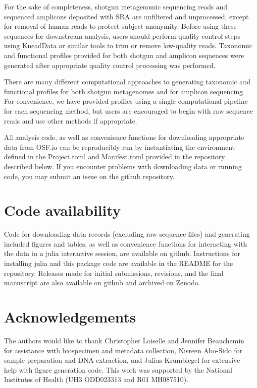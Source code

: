 \documentclass[fleqn,10pt]{wlscirep}
\begin{document}
For the sake of completeness, shotgun metagenomic sequencing reads and sequenced amplicons deposited with SRA
are unfiltered and unprocessed, except for removal of human reads to protect subject anonymity.
Before using these sequences for downstream analysis, users should perform quality control steps
using KneadData or similar tools to trim or remove low-quality reads.
Taxonomic and functional profiles provided for both shotgun and amplicon sequences
were generated after appropriate quality control processing was performed. 

There are many different computational approaches to generating taxonomic and functional profiles
for both shotgun metagenomes and for amplicon sequencing.
For convenience, we have provided profiles using a single computational pipeline for each sequencing method,
but users are encouraged to begin with raw sequence reads and use other methods if appropriate.

All analysis code, as well as convenience functions for downloading appropriate data from OSF.io
can be reproducibly run by instantiating the environment defined in the Project.toml and Manifest.toml
provided in the repository described below.
If you encounter problems with downloading data or running code, you may submit an issue on the github repository.

\section*{Code availability}

Code for downloading data records (excluding raw sequence files) and generating included figures and tables,
as well as convenience functions for interacting with the data in a julia interactive session,
are available on github.
Instructions for installing julia and this package code are available in the README for the repository.
Releases made for initial submissions, revisions, and the final manuscript
are also available on github and archived on Zenodo.



\section*{Acknowledgements}

The authors would like to thank Christopher Loiselle and Jennifer Beauchemin
for assistance with biospecimen and metadata collection,
Nisreen Abo-Sido for sample preparation and DNA extraction,
and Julius Krumbiegel for extensive help with figure generation code. 
This work was supported by the National Institutes of Health (UH3 ODD023313 and R01 MH087510). 
\end{document}
